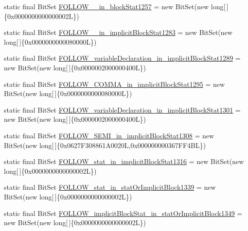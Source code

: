 \begin{DoxyCompactItemize}
\item 
static final Bit\-Set \hyperlink{classorg_1_1tzi_1_1use_1_1parser_1_1soil_1_1_soil_parser_a0dc528571417e5e1bb621bcf315a8b32}{F\-O\-L\-L\-O\-W\-\_\-\_\-in\-\_\-block\-Stat1257} = new Bit\-Set(new long\mbox{[}$\,$\mbox{]}\{0x0000000000000002\-L\})
\item 
static final Bit\-Set \hyperlink{classorg_1_1tzi_1_1use_1_1parser_1_1soil_1_1_soil_parser_accde72c6886d19c4c17d90fd3313329f}{F\-O\-L\-L\-O\-W\-\_\-\_\-in\-\_\-implicit\-Block\-Stat1283} = new Bit\-Set(new long\mbox{[}$\,$\mbox{]}\{0x0000000000080000\-L\})
\item 
static final Bit\-Set \hyperlink{classorg_1_1tzi_1_1use_1_1parser_1_1soil_1_1_soil_parser_a59522339635d2fcdb93eb7a7dc22b970}{F\-O\-L\-L\-O\-W\-\_\-variable\-Declaration\-\_\-in\-\_\-implicit\-Block\-Stat1289} = new Bit\-Set(new long\mbox{[}$\,$\mbox{]}\{0x0000002000000400\-L\})
\item 
static final Bit\-Set \hyperlink{classorg_1_1tzi_1_1use_1_1parser_1_1soil_1_1_soil_parser_a5d07a449fcce5f61d22cc106104c2420}{F\-O\-L\-L\-O\-W\-\_\-\-C\-O\-M\-M\-A\-\_\-in\-\_\-implicit\-Block\-Stat1295} = new Bit\-Set(new long\mbox{[}$\,$\mbox{]}\{0x0000000000080000\-L\})
\item 
static final Bit\-Set \hyperlink{classorg_1_1tzi_1_1use_1_1parser_1_1soil_1_1_soil_parser_a8b05415f45d5876811c6ca0ae9643e53}{F\-O\-L\-L\-O\-W\-\_\-variable\-Declaration\-\_\-in\-\_\-implicit\-Block\-Stat1301} = new Bit\-Set(new long\mbox{[}$\,$\mbox{]}\{0x0000002000000400\-L\})
\item 
static final Bit\-Set \hyperlink{classorg_1_1tzi_1_1use_1_1parser_1_1soil_1_1_soil_parser_a21e2838defeeaa9408523e4018f35e42}{F\-O\-L\-L\-O\-W\-\_\-\-S\-E\-M\-I\-\_\-in\-\_\-implicit\-Block\-Stat1308} = new Bit\-Set(new long\mbox{[}$\,$\mbox{]}\{0x0627\-F308861\-A0020\-L,0x000000000367\-F\-F4\-B\-L\})
\item 
static final Bit\-Set \hyperlink{classorg_1_1tzi_1_1use_1_1parser_1_1soil_1_1_soil_parser_a740c8c68ad1bcd20f32bb67c36c1fae7}{F\-O\-L\-L\-O\-W\-\_\-stat\-\_\-in\-\_\-implicit\-Block\-Stat1316} = new Bit\-Set(new long\mbox{[}$\,$\mbox{]}\{0x0000000000000002\-L\})
\item 
static final Bit\-Set \hyperlink{classorg_1_1tzi_1_1use_1_1parser_1_1soil_1_1_soil_parser_aba9adc446491c74bd8726ecf6cf442a4}{F\-O\-L\-L\-O\-W\-\_\-stat\-\_\-in\-\_\-stat\-Or\-Implicit\-Block1339} = new Bit\-Set(new long\mbox{[}$\,$\mbox{]}\{0x0000000000000002\-L\})
\item 
static final Bit\-Set \hyperlink{classorg_1_1tzi_1_1use_1_1parser_1_1soil_1_1_soil_parser_a8f381826834aa84b01002a5e847d32b8}{F\-O\-L\-L\-O\-W\-\_\-implicit\-Block\-Stat\-\_\-in\-\_\-stat\-Or\-Implicit\-Block1349} = new Bit\-Set(new long\mbox{[}$\,$\mbox{]}\{0x0000000000000002\-L\})

\end{DoxyCompactItemize}
